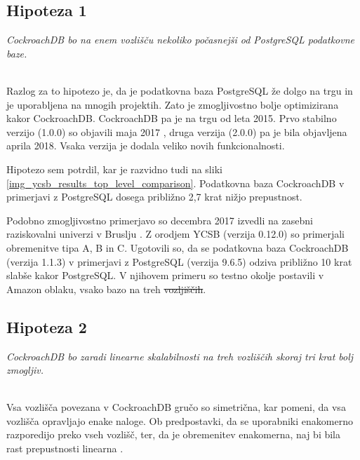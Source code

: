 \documentclass[a4paper, 12pt]{book}
\providecommand{\DIFaddtex}[1]{{\protect\color{blue}\uwave{#1}}} %
\providecommand{\DIFdeltex}[1]{{\protect\color{red}\sout{#1}}}                      %
\providecommand{\DIFaddbegin}{} %
\providecommand{\DIFaddend}{} %
\providecommand{\DIFdelbegin}{} %
\providecommand{\DIFdelend}{} %
\providecommand{\DIFadd}[1]{\texorpdfstring{\DIFaddtex{#1}}{#1}} %
\providecommand{\DIFdel}[1]{\texorpdfstring{\DIFdeltex{#1}}{}} %
\newcommand{\DIFscaledelfig}{0.5}
\newlength{\DIFdelgraphicswidth} %
\newlength{\DIFdelgraphicsheight} %
\newcommand{\DIFaddincludegraphics}[2][]{{\color{blue}\fbox{\DIFOincludegraphics[#1]{#2}}}} %
\newcommand{\DIFdelincludegraphics}[2][]{%
\sbox{\DIFdelgraphicsbox}{\DIFOincludegraphics[#1]{#2}}%
\settoboxwidth{\DIFdelgraphicswidth}{\DIFdelgraphicsbox} %
\settoboxtotalheight{\DIFdelgraphicsheight}{\DIFdelgraphicsbox} %
\scalebox{\DIFscaledelfig}{%
\parbox[b]{\DIFdelgraphicswidth}{\usebox{\DIFdelgraphicsbox}\\[-\baselineskip] \rule{\DIFdelgraphicswidth}{0em}}\llap{\resizebox{\DIFdelgraphicswidth}{\DIFdelgraphicsheight}{%
\setlength{\unitlength}{\DIFdelgraphicswidth}%
\begin{picture}(1,1)%
\thicklines\linethickness{2pt} %
{\color[rgb]{1,0,0}\put(0,0){\framebox(1,1){}}}%
{\color[rgb]{1,0,0}\put(0,0){\line( 1,1){1}}}%
{\color[rgb]{1,0,0}\put(0,1){\line(1,-1){1}}}%
\end{picture}%
}\hspace*{3pt}}} %
} %
\DeclareRobustCommand{\DIFaddbegin}{\DIFOaddbegin \let\includegraphics\DIFaddincludegraphics} %
\DeclareRobustCommand{\DIFaddend}{\DIFOaddend \let\includegraphics\DIFOincludegraphics} %
\DeclareRobustCommand{\DIFdelbegin}{\DIFOdelbegin \let\includegraphics\DIFdelincludegraphics} %
\DeclareRobustCommand{\DIFdelend}{\DIFOaddend \let\includegraphics\DIFOincludegraphics} %
\begin{document}
\subsection{Hipoteza 1}
\textit{CockroachDB bo na enem vozlišču nekoliko počasnejši od PostgreSQL podatkovne baze.}

\ \\
Razlog za to hipotezo je, da je podatkovna baza PostgreSQL že dolgo na trgu \cite{Postgres-first-release} in je uporabljena na mnogih projektih. Zato je zmogljivostno bolje optimizirana kakor CockroachDB. CockroachDB pa je na trgu od leta 2015. Prvo stabilno verzijo (1.0.0) so objavili maja 2017 \cite{CRDB-2017}, druga verzija (2.0.0) pa je bila objavljena aprila 2018. Vsaka verzija je dodala veliko novih funkcionalnosti.


Hipotezo sem potrdil, kar je razvidno tudi na sliki \ref{img_ycsb_results_top_level_comparison}. Podatkovna baza CockroachDB v primerjavi z PostgreSQL dosega približno 2,7 krat nižjo prepustnost.

Podobno zmogljivostno primerjavo so decembra 2017 izvedli na zasebni raziskovalni univerzi v Bruslju \cite{CRDB-2017}. Z orodjem YCSB (verzija 0.12.0) so primerjali obremenitve tipa A, B in C. Ugotovili so, da se podatkovna baza CockroachDB (verzija 1.1.3) v primerjavi z PostgreSQL (verzija 9.6.5) odziva približno 10 krat slabše kakor PostgreSQL. V njihovem primeru so testno okolje postavili v Amazon oblaku, vsako bazo na treh \DIFdelbegin \DIFdel{vozljiščih}\DIFdelend \DIFaddbegin \DIFadd{vozliščih}\DIFaddend .

\subsection{Hipoteza 2}
\textit{CockroachDB bo zaradi linearne skalabilnosti na treh vozliščih skoraj tri krat bolj zmogljiv.}

\ \\
Vsa vozlišča povezana v CockroachDB gručo so simetrična, kar pomeni, da vsa vozlišča opravljajo enake naloge. Ob predpostavki, da se uporabniki enakomerno razporedijo preko vseh vozlišč, ter, da je obremenitev enakomerna, naj bi bila rast prepustnosti linearna \cite{CRDB-design}.
\end{document}
